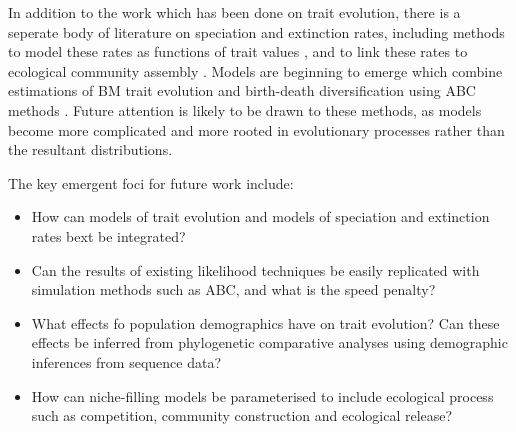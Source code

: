 \documentclass[12pt]{article}
\begin{document}
In addition to the work which has been done on trait evolution, there is a seperate body of literature on speciation and extinction rates, including methods to model these rates as functions of trait values \citep{freckleton_relating_2008, fitzjohn_quantitative_2010, fitzjohn_diversitree_2012, }, and to link these rates to ecological community assembly \citep{ingram_niche_2009, etienne_diversity_2012, raboski_equilibrium_2010}. 
Models are beginning to emerge which combine estimations of BM trait evolution and birth-death diversification using ABC methods \citep{slater_fitting_2012}. 
Future attention is likely to be drawn to these methods, as models become more complicated and more rooted in evolutionary processes rather than the resultant distributions.

The key emergent foci for future work include:

\begin{itemize}
  \item How can models of trait evolution and models of speciation and extinction rates bext be integrated?
  \item Can the results of existing likelihood techniques be easily replicated with simulation methods such as ABC, and what is the speed penalty?
  \item What effects fo population demographics have on trait evolution? Can these effects be inferred from phylogenetic comparative analyses using demographic inferences from sequence data? 
  \item How can niche-filling models be parameterised to include ecological process such as competition, community construction and ecological release?
\end{itemize}




\end{document}
